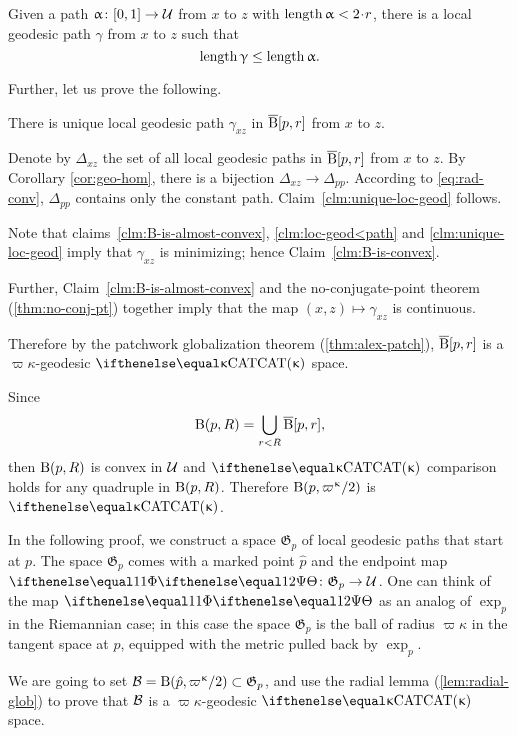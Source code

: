 \begin{clm}{}\label{clm:loc-geod<path}
Given a path $\alpha\:[0,1]\to\spc{U}$ from $x$ to $z$ with $\length\alpha<2\cdot r$,
there is a local geodesic path $\gamma$ from $x$ to $z$ such that
\[\length\gamma\le\length\alpha.\]

\end{clm}

Further, let us prove the following.

\begin{clm}{}\label{clm:unique-loc-geod}
There is unique local geodesic path $\gamma_{x z}$ in $\overline{\mathrm{B}}{}[ p,r]$ from $x$ to $z$.
\end{clm}

Denote by $\Delta_{x z}$ the set of all local geodesic paths in $\overline{\mathrm{B}}{}[ p,r]$ from $x$ to $z$.
By Corollary \ref{cor:geo-hom}, there is a  bijection $\Delta_{x z}\to\Delta_{p p}$.
According to \ref{eq:rad-conv}, 
$\Delta_{p p}$ contains only the constant path.
Claim~\ref{clm:unique-loc-geod} follows.


Note that 
claims~\ref{clm:B-is-almost-convex}, 
\ref{clm:loc-geod<path} 
and \ref{clm:unique-loc-geod}
imply that $\gamma_{x z}$ is minimizing; hence Claim~\ref{clm:B-is-convex}.

Further, Claim~\ref{clm:B-is-almost-convex} and the no-conjugate-point theorem (\ref{thm:no-conj-pt}) together 
imply that the map $(x,z)\mapsto\gamma_{x z}$ is continuous.

Therefore by the patchwork globalization theorem (\ref{thm:alex-patch}), 
$\overline{\mathrm{B}}{}[ p,r]$ is a $\varpi\kappa$-geodesic $\CAT\kappa$ space.

Since
\[\mathrm{B}{}( p,R)
=
\bigcup_{r < R}\overline{\mathrm{B}}{}[ p,r],\] 
then $\mathrm{B}{}( p,R)$ is convex in $\mathcal{U}$ and 
$\CAT\kappa$ comparison holds  for any quadruple in $\mathrm{B}{}( p,R)$.
Therefore $\oBall( p,\varpi\kappa/2)$ is $\CAT\kappa$.
\qeds


In the following proof, we construct a space $\mathfrak{G}_p$ of  local geodesic paths that start at $p$.
The space $\mathfrak{G}_p$ comes with 
a marked point $\hat p$ 
and the endpoint map $\map\:\mathfrak{G}_p\to\spc{U}$.
One can think of
the map $\map$ as an analog of $\exp_p$ in the Riemannian case; in this case
the space $\mathfrak{G}_p$ is the ball of radius $\varpi\kappa$ in the tangent space at $p$, equipped with the metric pulled back by $\exp_p$.

We are going to set $\spc{B}=\oBall(\hat p,\varpi\kappa/2)\subset \mathfrak{G}_p$,
and use the radial lemma (\ref{lem:radial-glob}) to prove that $\mathcal{B}$ is a $\varpi\kappa$-geodesic $\CAT\kappa$ space.

